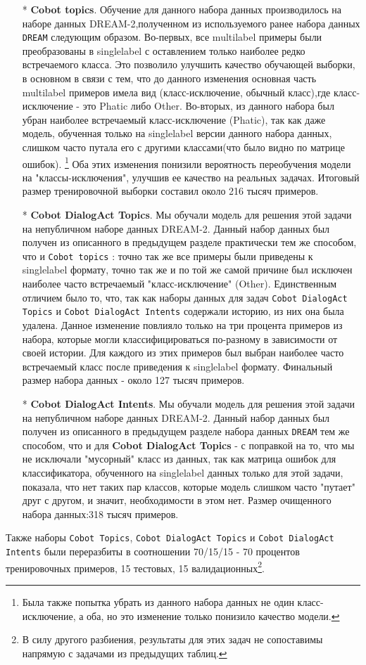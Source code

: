 \begin{itemize}
\item[*]\textbf{Cobot topics}. Обучение для данного набора данных производилось на наборе данных DREAM-2,полученном из используемого ранее набора данных \texttt{DREAM} следующим образом.
Во-первых, все multilabel примеры были преобразованы в singlelabel с оставлением только наиболее редко встречаемого класса. Это позволило улучшить качество обучающей выборки, в основном в связи с тем, что до данного изменения основная часть multilabel примеров имела вид (класс-исключение, обычный класс),где класс-исключение - это Phatic либо Other. Во-вторых, из данного набора был убран наиболее встречаемый класс-исключение (Phatic), так как даже модель, обученная только на singlelabel версии данного набора данных, слишком часто путала его с другими классами(что было видно по матрице ошибок). \footnote{Была также попытка убрать из данного набора данных не один класс-исключение, а оба, но это изменение только понизило качество модели.}
Оба этих изменения понизили вероятность переобучения модели на "классы-исключения", улучшив ее качество на реальных задачах. Итоговый размер тренировочной выборки составил около 216 тысяч примеров. 
\item[*]\textbf{Cobot DialogAct Topics}. Мы обучали модель для решения этой задачи на непубличном наборе данных DREAM-2. Данный набор данных был получен из  описанного в предыдущем разделе практически тем же способом, что и \texttt{Cobot topics} : точно так же все примеры были приведены к singlelabel формату, точно так же и по той же самой причине был исключен наиболее часто встречаемый "класс-исключение" (Other).
 Единственным отличием было то, что, так как наборы данных для задач \texttt{Cobot DialogAct Topics} и \texttt{Cobot DialogAct Intents} содержали историю, из них она была удалена. Данное изменение повлияло только на три процента примеров из набора, которые могли классифицироваться по-разному в зависимости от своей истории. Для каждого из этих примеров был выбран наиболее часто встречаемый класс после приведения к singlelabel формату. Финальный размер набора данных - около 127 тысяч примеров.

\item[*]\textbf{Cobot DialogAct Intents}. Мы обучали модель для решения этой задачи на непубличном наборе данных DREAM-2. Данный набор данных был получен из описанного в предыдущем разделе набора данных \texttt{DREAM} тем же способом, что и для \textbf{Cobot DialogAct Topics} - с поправкой на то, что мы не исключали "мусорный" класс из данных, так как матрица ошибок для классификатора, обученного на singlelabel данных только для этой задачи, показала, что нет таких пар классов, которые модель слишком часто "путает" друг с другом, и значит, необходимости в этом нет. Размер очищенного набора данных:318 тысяч примеров.
\end{itemize}
Также наборы \texttt{Cobot Topics}, \texttt{Cobot DialogAct Topics} и \texttt{Cobot DialogAct Intents} были переразбиты в соотношении 70/15/15 - 70 процентов тренировочных примеров, 15 тестовых, 15 валидационных\footnote{В силу другого разбиения, результаты для этих задач не сопоставимы напрямую с задачами из предыдущих таблиц.}.

